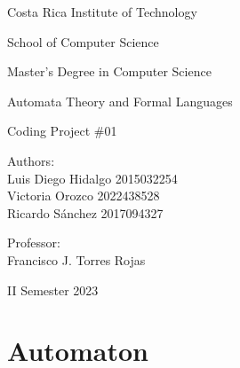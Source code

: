 \documentclass{article}
\begin{document}
    \begin{center}
        \vspace{1cm}

        {\LARGE{Costa Rica Institute of Technology}}

        \vspace{0.5cm}

        {\large School of Computer Science}

          \vspace{0.5cm}

        {\large Master's Degree in Computer Science}

        \vspace{0.5cm}

        {\large Automata Theory and Formal Languages}

        \vspace{2.5cm}

       {\Large Coding Project \#01}

        \vspace{2cm}

        {\Large Authors:  \vspace{0.5cm}\\Luis Diego Hidalgo 2015032254 \\ \vspace{0.5cm}
          Victoria Orozco 2022438528  \\ \vspace{0.5cm}
        Ricardo Sánchez  2017094327\\}

        \vspace{2cm}

        {\Large Professor:  \vspace{0.5cm}\\Francisco J. Torres Rojas\\}

        \vspace{2cm}

        {\large II Semester 2023}

    \end{center}

    \newpage

    \section*{Automaton}
\end{document}
